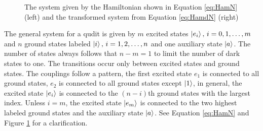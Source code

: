 \begin{figure}[H]
    \caption{The system given by the Hamiltonian shown in Equation \ref{eq:HamN} (left) and the transformed system from Equation \ref{eq:HamdN} (right)}
    \label{fig:HamN}
\end{figure}



The general system for a qudit is given by $m$ excited states $\ket{e_i},\,i = 0,1,\dots,m$ and $n$ ground states labeled $\ket{i},\,i = 1,2,\dots,n$ and one auxiliary state $\ket{a}$. The number of states always follows that $n-m = 1$ to limit the number of dark states to one\cite{lambda}.
The transitions occur only between excited states and ground states. The couplings follow a pattern, the first excited state $e_1$ is connected to all ground states, $e_2$ is connected to all ground states except $\ket{1}$, in general, the excited state $\ket{e_i}$ is connected to the $(n - i)$th ground states with the largest index. Unless $i = m$, the excited state $\ket{e_m}$ is connected to the two highest labeled ground states and the auxiliary state $\ket{a}$. See Equation \ref{eq:HamN} and Figure \ref{fig:HamN} for a clarification. 

